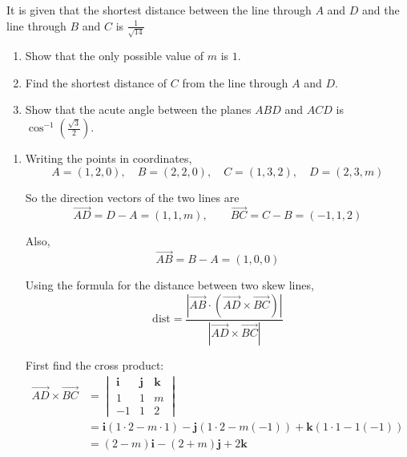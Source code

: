 \documentclass[leqno]{article}
\begin{document}
\begin{enumerate}[
  label=\textbf{\arabic*.},
  leftmargin=*,
  topsep=0pt,
  partopsep=0pt,
  parsep=0pt
]
It is given that the shortest distance between the line through $A$ and $D$ and the line through $B$ and $C$ is $\tfrac{1}{\sqrt{14}}$ \\
\begin{enumerate}[label=\textbf{(\alph*)}]
  \item Show that the only possible value of $m$ is $1$.  \\
  \item Find the shortest distance of $C$ from the line through $A$ and $D$.  \\
  \item Show that the acute angle between the planes $ABD$ and $ACD$ is $\cos^{-1}\left(\frac{\sqrt{3}}{2}\right)$.  \\
\end{enumerate}

\vspace*{30pt}

\begin{tcolorbox}[colback=white, colframe=scarlet, title={\textbf{Solution}}, breakable, grow to left by=6mm, grow to right by=10mm]
\begin{enumerate}[label=\textbf{(\alph*)}]
\item Writing the points in coordinates,
\[
A=(1,2,0),\quad B=(2,2,0),\quad C=(1,3,2),\quad D=(2,3,m)
\]

So the direction vectors of the two lines are
\[
\overrightarrow{AD}=D-A=(1,1,m),\qquad \overrightarrow{BC}=C-B=(-1,1,2)
\]

Also,
\[
\overrightarrow{AB}=B-A=(1,0,0)
\]

Using the formula for the distance between two skew lines,
\[
\mathrm{dist}=\frac{\left\lvert \overrightarrow{AB}\cdot\left(\overrightarrow{AD}\times\overrightarrow{BC}\right)\right\rvert}{\left\lvert \overrightarrow{AD}\times\overrightarrow{BC}\right\rvert}
\]

First find the cross product:
\begin{align*}
\overrightarrow{AD}\times\overrightarrow{BC}
&=
\begin{vmatrix}
\mathbf i & \mathbf j & \mathbf k\\
1 & 1 & m\\
-1 & 1 & 2
\end{vmatrix} \\
&= \mathbf i(1\cdot 2-m\cdot 1)-\mathbf j(1\cdot 2-m(-1))+\mathbf k(1\cdot 1-1(-1)) \\
&= (2-m)\mathbf i-(2+m)\mathbf j+2\mathbf k
\end{align*}


\end{enumerate}
\end{tcolorbox}
\end{enumerate}
\end{document}
